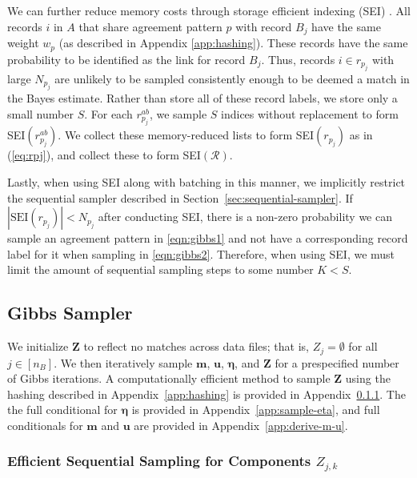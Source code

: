 \documentclass[12pt,letterpaper]{article}
\newcommand{\1}[1]{\mathbb{I}\!\left[#1\right]} %
\begin{document}
We can further reduce memory costs through storage efficient indexing (SEI) \citep{kundinger_2023}. All records $i$ in $A$ that share agreement pattern $p$ with record $B_j$ have the same weight $w_{p}$ (as described in Appendix \ref{app:hashing}). These records have the same probability to be identified as the link for record $B_j$. Thus, records $i \in r_{p_j}$ with large $N_{p_j}$ are unlikely to be sampled consistently enough to be deemed a match in the Bayes estimate. Rather than store all of these record labels, we store only a small number $S$. For each $r_{p_j}^{ab}$, we sample $S$ indices without replacement to form SEI$(r_{p_j}^{ab})$. We collect these memory-reduced lists to form SEI$(r_{p_j})$ as in (\ref{eq:rpj}), and collect these to form SEI$(\mathcal{R})$.

Lastly, when using SEI along with batching in this manner, we implicitly restrict the sequential sampler described in Section~\ref{sec:sequential-sampler}. If $|\text{SEI}(r_{p_j})| < N_{p_j}$ after conducting SEI, there is a non-zero probability we can sample an agreement pattern in \eqref{eqn:gibbs1} and not have a corresponding record label for it when sampling in \eqref{eqn:gibbs2}. Therefore, when using SEI, we must limit the amount of sequential sampling steps to some number $K < S$.

\subsection{Gibbs Sampler}\label{app:gibbs-sampler}

We initialize $\bm{Z}$ to reflect no matches across data files; that is, $Z_j = \emptyset$ for all $j \in [n_B]$. We then iteratively sample $\bm{m}$,  $\bm{u}$, $\bm{\eta}$, and $\bm{Z}$ for a prespecified number of Gibbs iterations. A computationally efficient method to sample $\bm{Z}$ using the hashing described in Appendix~\ref{app:hashing} is provided in Appendix~\ref{app:efficient-sampling}. The the full conditional for $\bm{\eta}$ is provided in Appendix~\ref{app:sample-eta}, and full conditionals for $\bm{m}$ and $\bm{u}$ are provided in Appendix~\ref{app:derive-m-u}.

\subsubsection{Efficient Sequential Sampling for Components $Z_{j, k}$}\label{app:efficient-sampling}
\end{document}

